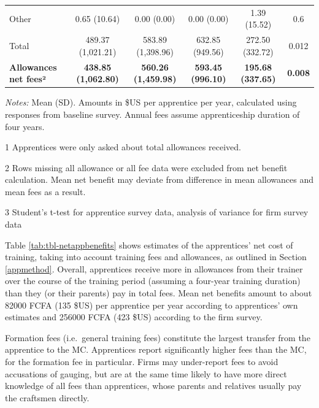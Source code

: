 \documentclass[
  a4paper, twoside, 12pt]{book}
\begin{document}
\begin{table}[H]
{\begin{threeparttable}
\begin{tabular}[t]{lccccc}
\hspace{1em}\hspace{1em}Other & 0.65 (10.64) & 0.00 (0.00) & 0.00 (0.00) & 1.39 (15.52) & 0.6\\
\hspace{1em}\hspace{1em}Total & 489.37 (1,021.21) & 583.89 (1,398.96) & 632.85 (949.56) & 272.50 (332.72) & 0.012\\
\textbf{\hspace{1em}Allowances net fees²} & \textbf{438.85 (1,062.80)} & \textbf{560.26 (1,459.98)} & \textbf{593.45 (996.10)} & \textbf{195.68 (337.65)} & \textbf{0.008}\\
\bottomrule
\end{tabular}
\begin{tablenotes}
\small
\item \textit{Notes:} Mean (SD). Amounts in \$US per apprentice per year, calculated using responses from baseline survey. Annual fees assume apprenticeship duration of four years.
\item[1] Apprentices were only asked about total allowances received.
\item[2] Rows missing all allowance or all fee data were excluded from net benefit calculation. Mean net benefit may deviate from difference in mean allowances and mean fees as a result.
\item[3] Student's t-test for apprentice survey data, analysis of variance for firm survey data
\end{tablenotes}
\end{threeparttable}}
\end{table}

Table \ref{tab:tbl-netappbenefits} shows estimates of the apprentices' net cost of training, taking into account training fees and allowances, as outlined in Section \ref{appmethod}. Overall, apprentices receive more in allowances from their trainer over the course of the training period (assuming a four-year training duration) than they (or their parents) pay in total fees. Mean net benefits amount to about 82000 FCFA (135 \$US) per apprentice per year according to apprentices' own estimates and 256000 FCFA (423 \$US) according to the firm survey.

Formation fees (i.e.~general training fees) constitute the largest transfer from the apprentice to the MC. Apprentices report significantly higher fees than the MC, for the formation fee in particular. Firms may under-report fees to avoid accusations of gauging, but are at the same time likely to have more direct knowledge of all fees than apprentices, whose parents and relatives usually pay the craftsmen directly.
\end{document}
